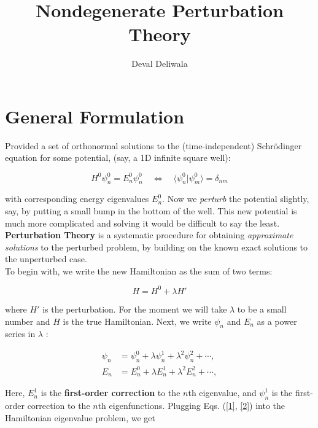 \documentclass[svgnames]{article}     %
\title{Nondegenerate Perturbation Theory}
\author{Deval Deliwala}
\begin{document}
\maketitle


\section{General Formulation} 

Provided a set of orthonormal solutions to the (time-independent) Schr\"odinger
equation for some potential, (say, a 1D infinite square well):

\[
H^0 \psi_n^0 = E_n^0 \psi_n^0 \quad \Leftrightarrow \quad \langle \psi_n^0
| \psi_m^0\rangle = \delta_{nm}
\] \vspace{3px}

with corresponding energy eigenvalues $E_n^0$. Now we \textit{perturb} the
potential slightly, say, by putting a small bump in the bottom of the well.
This new potential is much more complicated and solving it would be difficult
to say the least. \textbf{Perturbation Theory} is a systematic procedure for
obtaining \textit{approximate solutions}  to the perturbed problem, by building
on the known exact solutions to the unperturbed case. \\

To begin with, we write the new Hamiltonian as the sum of two terms: 

\[
H = H^0 + \lambda H' 
\] \vspace{3px}

where $H'$ is the perturbation. For the moment we will take $\lambda$ to be
a small number and $H$ is the true Hamiltonian. Next, we write $\psi_n$ and
$E_n$ as a power series in $\lambda$ : 

\begin{align}
  \psi_n &= \psi_n^0 + \lambda \psi_n^1 + \lambda^2 \psi_n^2 + \cdots, \label{1} \\
  E_n &= E_n^0 + \lambda E_n^1 + \lambda^2 E_n^2 + \cdots,  \label{2}
\end{align}

Here, $E_n^1$ is the \textbf{first-order correction} to the $n $th
eigenvalue, and $\psi_n^1$ is the first-order correction to the $n$th
eigenfunctions. Plugging Eqs. (\ref{1}, \ref{2}) into the Hamiltonian
eigenvalue problem, we get 
\end{document}
